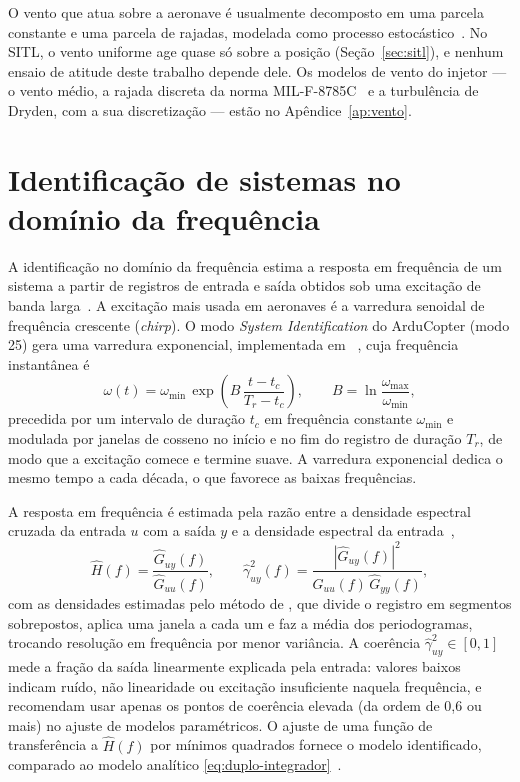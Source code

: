 O vento que atua sobre a aeronave é usualmente decomposto em uma parcela
constante e uma parcela de rajadas, modelada como processo
estocástico~\cite{beard2012}. No SITL, o vento uniforme age quase só sobre a
posição (Seção~\ref{sec:sitl}), e nenhum ensaio de atitude deste trabalho
depende dele. Os modelos de vento do injetor --- o vento médio, a rajada
discreta da norma MIL-F-8785C~\cite{mil8785c} e a turbulência de Dryden, com
a sua discretização --- estão no Apêndice~\ref{ap:vento}.

\section{Identificação de sistemas no domínio da frequência}
\label{sec:identificacao}

A identificação no domínio da frequência estima a resposta em frequência de
um sistema a partir de registros de entrada e saída obtidos sob uma excitação
de banda larga~\cite{ljung1999,pintelon2012,tischler2012}. A excitação mais usada em
aeronaves é a varredura senoidal de frequência crescente (\textit{chirp}). O
modo \textit{System Identification} do ArduCopter (modo 25) gera uma
varredura exponencial, implementada em
~\cite{ardupilot2026}, cuja frequência instantânea
é
\begin{equation}
\omega(t) = \omega_{\min}\,\exp\!\left(B\,\frac{t - t_c}{T_r - t_c}\right),
\qquad B = \ln\frac{\omega_{\max}}{\omega_{\min}},
\label{eq:chirp}
\end{equation}
precedida por um intervalo de duração $t_c$ em frequência constante
$\omega_{\min}$ e modulada por janelas de cosseno no início e no fim do
registro de duração $T_r$, de modo que a excitação comece e termine suave.
A varredura exponencial dedica o mesmo tempo a cada década, o que favorece as
baixas frequências.

A resposta em frequência é estimada pela razão entre a densidade espectral
cruzada da entrada $u$ com a saída $y$ e a densidade espectral da
entrada~\cite{carter1973,tischler2012},
\begin{equation}
\hat H(f) = \frac{\hat G_{uy}(f)}{\hat G_{uu}(f)},
\qquad
\hat\gamma^2_{uy}(f) = \frac{|\hat G_{uy}(f)|^2}{\hat G_{uu}(f)\,\hat G_{yy}(f)},
\label{eq:frf}
\end{equation}
com as densidades estimadas pelo método de , que divide
o registro em segmentos sobrepostos, aplica uma janela a cada um e faz a
média dos periodogramas, trocando resolução em frequência por menor
variância. A coerência $\hat\gamma^2_{uy} \in [0, 1]$ mede a fração da saída
linearmente explicada pela entrada: valores baixos indicam ruído,
não linearidade ou excitação insuficiente naquela frequência, e
 recomendam usar apenas os pontos de coerência
elevada (da ordem de 0,6 ou mais) no ajuste de modelos paramétricos. O ajuste
de uma função de transferência a $\hat H(f)$ por mínimos quadrados fornece o
modelo identificado, comparado ao modelo analítico
\eqref{eq:duplo-integrador}~\cite{ljung1999,pintelon2012}.

